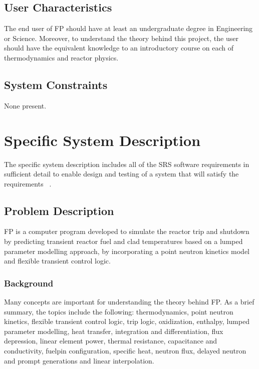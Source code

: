  \subsection{User Characteristics}

 The end user of FP should have at least an undergraduate degree in Engineering
 or Science. Moreover, to understand the theory behind this project, the user
 should have the equivalent knowledge to an introductory course on each of
 thermodynamics and reactor physics.

\subsection{System Constraints}

None present.

\section{Specific System Description}

The specific system description includes all of the SRS software requirements in
sufficient detail to enable design and testing of a system that will satisfy the
requirements ~\cite{SmithAndLai2005}.

\subsection{Problem Description} \label{Sec_pd}

FP is a computer program developed to simulate the reactor trip and shutdown by
predicting transient reactor fuel and clad temperatures based on a lumped
parameter modelling approach, by incorporating a point neutron kinetics model
and flexible transient control logic.

\subsubsection{Background}

Many concepts are important for understanding the theory behind FP. As a brief
summary, the topics include the following: thermodynamics, point neutron
kinetics, flexible transient control logic, trip logic, oxidization, enthalpy,
lumped parameter modelling, heat transfer, integration and differentiation, flux
depression, linear element power, thermal resistance, capacitance and
conductivity, fuelpin configuration, specific heat, neutron flux, delayed
neutron and prompt generations and linear interpolation.

